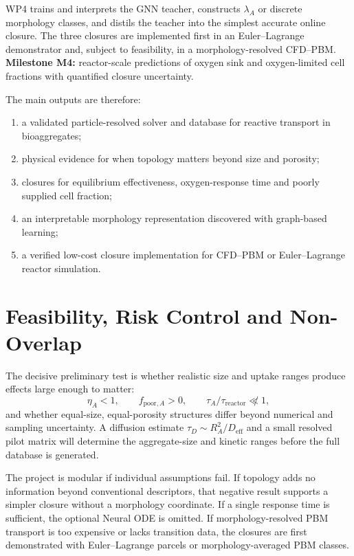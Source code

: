 \documentclass[11pt,a4paper]{article}
\begin{document}
WP4 trains and interprets the GNN teacher, constructs \(\lambda_A\) or discrete
morphology classes, and distils the teacher into the simplest accurate online
closure. The three closures are implemented first in an Euler--Lagrange
demonstrator and, subject to feasibility, in a morphology-resolved CFD--PBM.
\textbf{Milestone M4:} reactor-scale predictions of oxygen sink and
oxygen-limited cell fractions with quantified closure uncertainty.

The main outputs are therefore:
\begin{enumerate}
  \item a validated particle-resolved solver and database for reactive
  transport in bioaggregates;
  \item physical evidence for when topology matters beyond size and porosity;
  \item closures for equilibrium effectiveness, oxygen-response time and
  poorly supplied cell fraction;
  \item an interpretable morphology representation discovered with graph-based
  learning;
  \item a verified low-cost closure implementation for CFD--PBM or
  Euler--Lagrange reactor simulation.
\end{enumerate}

\section{Feasibility, Risk Control and Non-Overlap}

The decisive preliminary test is whether realistic size and uptake ranges
produce effects large enough to matter:
\begin{equation}
  \eta_A<1,\qquad
  f_{\mathrm{poor},A}>0,\qquad
  \tau_A/\tau_{\mathrm{reactor}}\not\ll1,
  \label{eq:feasibility}
\end{equation}
and whether equal-size, equal-porosity structures differ beyond numerical and
sampling uncertainty. A diffusion estimate
\(\tau_D\sim R_A^2/D_{\mathrm{eff}}\) and a small resolved pilot matrix will
determine the aggregate-size and kinetic ranges before the full database is
generated.

The project is modular if individual assumptions fail. If topology adds no
information beyond conventional descriptors, that negative result supports a
simpler closure without a morphology coordinate. If a single response time is
sufficient, the optional Neural ODE is omitted. If morphology-resolved PBM
transport is too expensive or lacks transition data, the closures are first
demonstrated with Euler--Lagrange parcels or morphology-averaged PBM classes.
\end{document}
